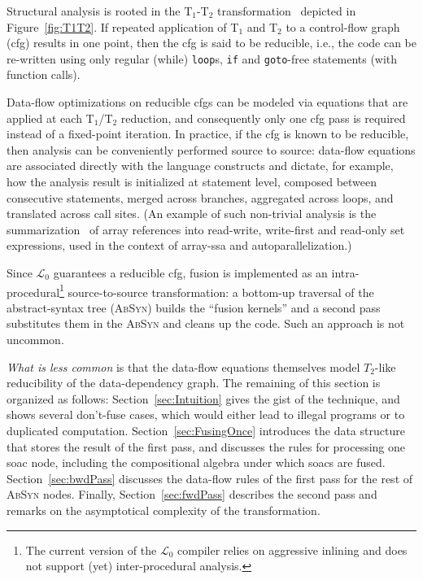 \documentclass{sigplanconf}  %
\newcommand{\LO}{$\mathcal{L}_0$}
\begin{document}
Structural analysis is rooted in the T$_1$-T$_2$ transformation~\cite{T12}
depicted in Figure~\ref{fig:T1T2}.
If repeated application of T$_1$ and T$_2$ to a control-flow graph ({\sc cfg}) 
results in one point, then the {\sc cfg} is said to be reducible, i.e.,
the code can be re-written using only regular (while) {\tt loop}s, 
{\tt if} and {\tt goto}-free statements (with function calls).

Data-flow optimizations on reducible {\sc cfg}s can be modeled via equations 
that are applied at each T$_1$/T$_2$ reduction, and consequently only one
{\sc cfg} pass is required instead of a fixed-point iteration.
%
In practice, if the {\sc cfg} is known to be reducible, then 
analysis can be conveniently performed source to source: 
data-flow equations are associated directly with the
language constructs and dictate, for example, how the analysis result is
initialized at statement level, composed between consecutive statements,
merged across branches, aggregated across loops, and translated across 
call sites.  (An example of such non-trivial 
analysis is the summarization~\cite{HybAn} of array references into 
read-write, write-first and read-only set expressions, used in the context 
of array-{\sc ssa} and autoparallelization.)
 
Since \LO{} guarantees a reducible {\sc cfg}, %
fusion is implemented as an intra-procedural\footnote{
The current version of the \LO{} compiler 
relies on aggressive inlining and does not support
(yet) inter-procedural analysis.
}
source-to-source transformation: a bottom-up traversal of the 
abstract-syntax tree (\textsc{AbSyn}) builds the ``fusion kernels'' 
and a second pass substitutes them in the \textsc{AbSyn} and 
cleans up the code.    Such an approach is not uncommon. 

{\em What is less common} is that the data-flow equations 
themselves model $T_2$-like reducibility of the data-dependency graph.
The remaining of this section is organized as follows:
Section~\ref{sec:Intuition} gives the gist of the technique,
and shows several don't-fuse cases, which would
either lead to illegal programs or to duplicated computation.
%
Section~\ref{sec:FusingOnce} introduces the data structure
that stores the result of the first pass, and discusses the rules 
for processing one {\sc soac} node, including the compositional
algebra under which {\sc soac}s are fused. 
Section~\ref{sec:bwdPass} discusses the data-flow rules of
the first pass for the rest of \textsc{AbSyn} nodes.
Finally, Section~\ref{sec:fwdPass} describes the second
pass and remarks on the asymptotical 
complexity of the transformation.
\end{document}
